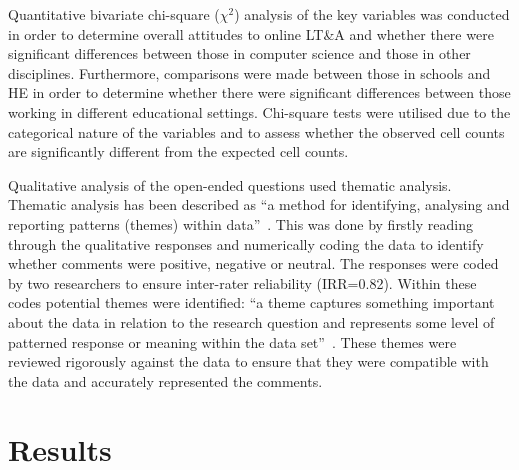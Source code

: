 \documentclass[conference]{IEEEtran}
\begin{document}
Quantitative bivariate chi-square ($\chi^2$) analysis of the key
variables was conducted in order to determine overall attitudes to
online LT\&A and whether there were significant differences between
those in computer science and those in other disciplines. Furthermore,
comparisons were made between those in schools and HE in order to
determine whether there were significant differences between those
working in different educational settings. Chi-square tests were
utilised due to the categorical nature of the variables and to assess
whether the observed cell counts are significantly different from the
expected cell counts.


Qualitative analysis of the open-ended questions used thematic
analysis. Thematic analysis has been described as ``a method for
identifying, analysing and reporting patterns (themes) within
data''~\cite{braun+clarke:2006}. This was done by firstly reading
through the qualitative responses and numerically coding the data to
identify whether comments were positive, negative or neutral. The
responses were coded by two researchers to ensure inter-rater
reliability (IRR=0.82). Within these codes potential themes were
identified: ``a theme captures something important about the data in
relation to the research question and represents some level of
patterned response or meaning within the data
set''~\cite[p.82]{braun+clarke:2006}. These themes were reviewed
rigorously against the data to ensure that they were compatible with
the data and accurately represented the comments.


\section{Results}\label{results}
\end{document}
